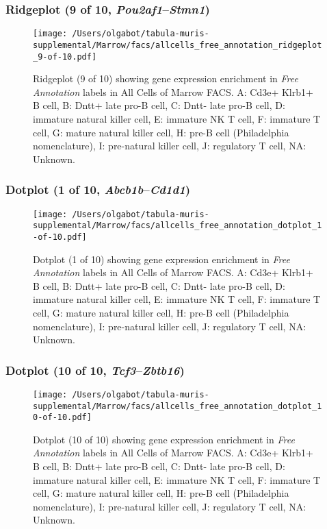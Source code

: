 \clearpage

\subsubsection{Ridgeplot (9 of 10, \emph{Pou2af1}--\emph{Stmn1})}
\begin{figure}[h]
\centering
\texttt{[image: /Users/olgabot/tabula-muris-supplemental/Marrow/facs/allcells\_free\_annotation\_ridgeplot\_9-of-10.pdf]}

\caption{ Ridgeplot (9 of 10)  showing gene expression enrichment in \emph{Free Annotation} labels in All Cells of Marrow FACS. A: Cd3e+ Klrb1+ B cell, B: Dntt+ late pro-B cell, C: Dntt- late pro-B cell, D: immature natural killer cell, E: immature NK T cell, F: immature T cell, G: mature natural killer cell, H: pre-B cell (Philadelphia nomenclature), I: pre-natural killer cell, J: regulatory T cell, NA: Unknown.}
\end{figure}


\clearpage

\subsubsection{Dotplot (1 of 10, \emph{Abcb1b}--\emph{Cd1d1})}
\begin{figure}[h]
\centering
\texttt{[image: /Users/olgabot/tabula-muris-supplemental/Marrow/facs/allcells\_free\_annotation\_dotplot\_1-of-10.pdf]}

\caption{ Dotplot (1 of 10)  showing gene expression enrichment in \emph{Free Annotation} labels in All Cells of Marrow FACS. A: Cd3e+ Klrb1+ B cell, B: Dntt+ late pro-B cell, C: Dntt- late pro-B cell, D: immature natural killer cell, E: immature NK T cell, F: immature T cell, G: mature natural killer cell, H: pre-B cell (Philadelphia nomenclature), I: pre-natural killer cell, J: regulatory T cell, NA: Unknown.}
\end{figure}


\clearpage

\subsubsection{Dotplot (10 of 10, \emph{Tcf3}--\emph{Zbtb16})}
\begin{figure}[h]
\centering
\texttt{[image: /Users/olgabot/tabula-muris-supplemental/Marrow/facs/allcells\_free\_annotation\_dotplot\_10-of-10.pdf]}

\caption{ Dotplot (10 of 10)  showing gene expression enrichment in \emph{Free Annotation} labels in All Cells of Marrow FACS. A: Cd3e+ Klrb1+ B cell, B: Dntt+ late pro-B cell, C: Dntt- late pro-B cell, D: immature natural killer cell, E: immature NK T cell, F: immature T cell, G: mature natural killer cell, H: pre-B cell (Philadelphia nomenclature), I: pre-natural killer cell, J: regulatory T cell, NA: Unknown.}
\end{figure}


